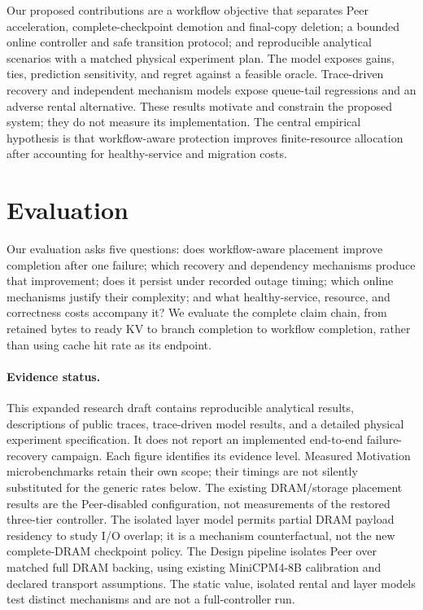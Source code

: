 \documentclass[sigplan,10pt,anonymous,nonacm]{acmart}
\begin{document}
Our proposed contributions are a workflow objective that separates Peer
acceleration, complete-checkpoint demotion and final-copy deletion; a bounded online controller and safe transition
protocol; and reproducible analytical scenarios with a matched physical
experiment plan. The model exposes gains, ties, prediction sensitivity,
and regret against a feasible oracle. Trace-driven recovery and independent
mechanism models expose queue-tail regressions and an adverse rental
alternative. These results
motivate and constrain the proposed
system; they do not measure its implementation. The central empirical
hypothesis is that workflow-aware protection improves finite-resource
allocation after accounting for healthy-service and migration costs.





\section{Evaluation}
\label{sec:evaluation}

Our evaluation asks five questions: does workflow-aware placement improve
completion after one failure; which recovery and dependency mechanisms
produce that improvement; does it persist under recorded outage timing;
which online mechanisms justify their complexity; and what healthy-service,
resource, and correctness costs accompany it? We evaluate the complete
claim chain, from retained bytes to ready KV to branch completion to
workflow completion, rather than using cache hit rate as its endpoint.

\paragraph{Evidence status.}
This expanded research draft contains reproducible analytical results,
descriptions of public traces, trace-driven model results, and a detailed
physical experiment specification. It does not report an implemented
end-to-end failure-recovery campaign. Each figure identifies its evidence
level. Measured Motivation microbenchmarks retain their own scope;
their timings are not silently substituted for the generic rates below.
The existing DRAM/storage placement results are the Peer-disabled
configuration, not measurements of the restored three-tier controller.
The isolated layer model permits partial DRAM payload residency to study
I/O overlap; it is a mechanism counterfactual, not the new complete-DRAM
checkpoint policy. The Design pipeline isolates Peer over matched full DRAM backing,
using existing MiniCPM4-8B calibration and declared transport assumptions. The static value, isolated rental and
layer models test distinct mechanisms and are not a full-controller run.
\end{document}
